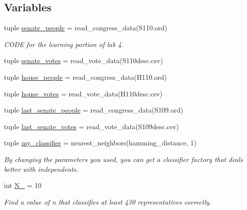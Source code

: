 \subsection*{Variables}
\begin{DoxyCompactItemize}
\item 
tuple \hyperlink{namespacelab4_ab431969dcbdc497ed29f78787174f64b}{senate\+\_\+people} = read\+\_\+congress\+\_\+data(\textquotesingle{}S110.\+ord\textquotesingle{})
\begin{DoxyCompactList}\small\item\em C\+O\+D\+E for the learning portion of lab 4. \end{DoxyCompactList}\item 
tuple \hyperlink{namespacelab4_ac5205d0d5639e598abd827580ff7f6ce}{senate\+\_\+votes} = read\+\_\+vote\+\_\+data(\textquotesingle{}S110desc.\+csv\textquotesingle{})
\item 
tuple \hyperlink{namespacelab4_aa3012299c849f02ae31ae12757cf2f47}{house\+\_\+people} = read\+\_\+congress\+\_\+data(\textquotesingle{}H110.\+ord\textquotesingle{})
\item 
tuple \hyperlink{namespacelab4_aaf99ce787c94a9fc9d4d77942cf300c3}{house\+\_\+votes} = read\+\_\+vote\+\_\+data(\textquotesingle{}H110desc.\+csv\textquotesingle{})
\item 
tuple \hyperlink{namespacelab4_a1ede50f42a59bf83d5c09c3aef93c234}{last\+\_\+senate\+\_\+people} = read\+\_\+congress\+\_\+data(\textquotesingle{}S109.\+ord\textquotesingle{})
\item 
tuple \hyperlink{namespacelab4_a7770c32cb0f0983cb6ae508b479e7a6d}{last\+\_\+senate\+\_\+votes} = read\+\_\+vote\+\_\+data(\textquotesingle{}S109desc.\+csv\textquotesingle{})
\item 
tuple \hyperlink{namespacelab4_a00fffafa3b319c7bff473fdf1b6a45e7}{my\+\_\+classifier} = nearest\+\_\+neighbors(hamming\+\_\+distance, 1)
\begin{DoxyCompactList}\small\item\em By changing the parameters you used, you can get a classifier factory that deals better with independents. \end{DoxyCompactList}\item 
int \hyperlink{namespacelab4_a950de6b6a30b3a64b09305c0a1f52990}{N\+\_} = 10
\begin{DoxyCompactList}\small\item\em Find a value of n that classifies at least 430 representatives correctly. \end{DoxyCompactList}\item 

\end{DoxyCompactItemize}
